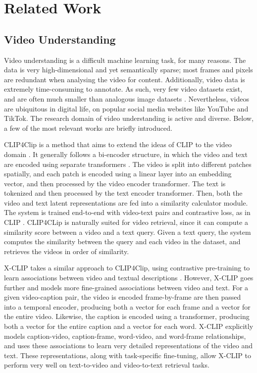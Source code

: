 \section{Related Work}

\subsection{Video Understanding}

Video understanding is a difficult machine learning task, for many reasons.
The data is very high-dimensional and yet semantically sparse; most frames and pixels are redundant when analysing the video for content.
Additionally, video data is extremely time-consuming to annotate.
As such, very few video datasets exist, and are often much smaller than analogous image datasets \cite{imagenet} \cite{coco}.
Nevertheless, videos are ubiquitous in digital life, on popular social media websites like YouTube and TikTok. 
The research domain of video understanding is active and diverse.
Below, a few of the most relevant works are briefly introduced.

CLIP4Clip is a method that aims to extend the ideas of CLIP \cite{clip} to the video domain \cite{clip4clip}.
It generally follows a bi-encoder structure, in which the video and text are encoded using separate transformers \cite{transformer}.
The video is split into different patches spatially, and each patch is encoded using a linear layer into an embedding vector, and then processed by the video encoder transformer.
The text is tokenized and then processed by the text encoder transformer.
Then, both the video and text latent representations are fed into a similarity calculator module.
The system is trained end-to-end with video-text pairs and contrastive loss, as in CLIP \cite{clip}.
CLIP4CLip is naturally suited for video retrieval, since it can compute a similarity score between a video and a text query.
Given a text query, the system computes the similarity between the query and each video in the dataset, and retrieves the videos in order of similarity.

X-CLIP takes a similar approach to CLIP4Clip, using contrastive pre-training to learn associations between video and textual descriptions \cite{xclip}.
However, X-CLIP goes further and models more fine-grained associations between video and text.
For a given video-caption pair, the video is encoded frame-by-frame are then passed into a temporal encoder, producing both a vector for each frame and a vector for the entire video.
Likewise, the caption is encoded using a transformer, producing both a vector for the entire caption and a vector for each word.
X-CLIP explicitly models caption-video, caption-frame, word-video, and word-frame relationships, and uses these associations to learn very detailed representations of the video and text.
These representations, along with task-specific fine-tuning, allow X-CLIP to perform very well on text-to-video and video-to-text retrieval tasks.


